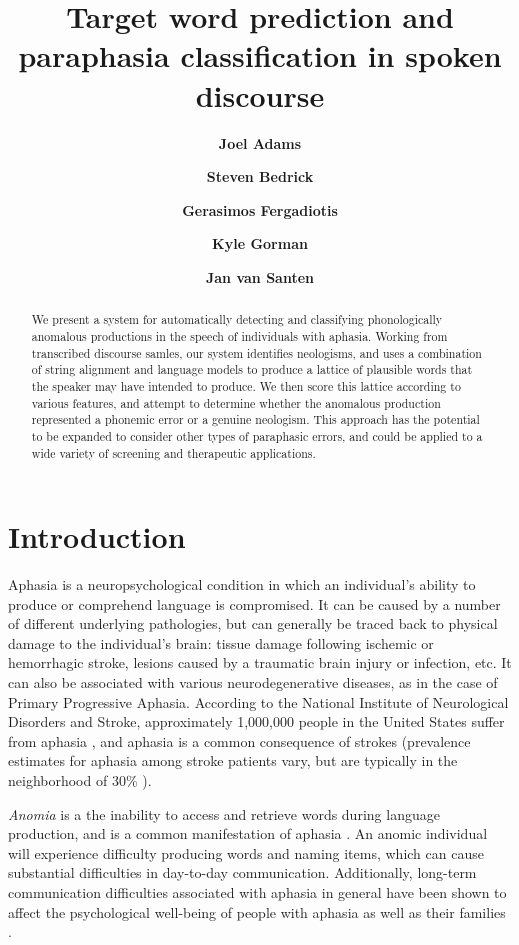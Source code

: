 \documentclass[11pt,letterpaper]{article}
\title{Target word prediction and paraphasia classification in spoken discourse}
\author[1]{\textbf{Joel Adams}}
\author[1]{\textbf{Steven Bedrick}}
\author[2]{\textbf{Gerasimos Fergadiotis}}
\author[3]{\textbf{Kyle Gorman}}
\author[1]{\textbf{Jan van Santen}}
\affil[1]{Center for Spoken Language Understanding, Oregon Health \& Science University, Portland, OR}
\affil[2]{Speech \& Hearing Sciences Department, Portland State University, Portland, OR}
\affil[3]{Google, Inc., New York, NY}
\date{}
\begin{document}
\maketitle

\begin{abstract}

We present a system for automatically detecting and classifying phonologically anomalous productions in the speech of individuals with aphasia.
Working from transcribed discourse samles, our system identifies neologisms, and uses a combination of string alignment and language models to produce a lattice of plausible words that the speaker may have intended to produce.
We then score this lattice according to various features, and attempt to determine whether the anomalous production represented a phonemic error or a genuine neologism.
This approach has the potential to be expanded to consider other types of paraphasic errors, and could be applied to a wide variety of screening and therapeutic applications.

\end{abstract}

\section{Introduction}

Aphasia is a neuropsychological condition in which an individual's ability to produce or comprehend language is compromised.
It can be caused by a number of different underlying pathologies, but can generally be traced back to physical damage to the individual's brain: tissue damage following ischemic or hemorrhagic stroke, lesions caused by a traumatic brain injury or infection, etc.
It can also be associated with various neurodegenerative diseases, as in the case of Primary Progressive Aphasia.
According to the National Institute of Neurological Disorders and Stroke, approximately 1,000,000 people in the United States suffer from aphasia \cite{National-Institute-of-Neurological-Disorders-and-Stroke:2014la}, and aphasia is a common consequence of strokes (prevalence estimates for aphasia among stroke patients vary, but are typically in the neighborhood of 30\% \cite{Engelter:2006da}).

\emph{Anomia} is a the inability to access and retrieve words during language production, and is a common manifestation of aphasia \cite{Goodglass:1997ys}.
An anomic individual will experience difficulty producing words and naming items, which can cause substantial difficulties in day-to-day communication.
Additionally, long-term communication difficulties associated with aphasia in general have been shown to affect the psychological well-being of people with aphasia as well as their families \cite{doi:10.1080/02687030244000707,Gaete:2008jr,vanDijk:2015gz}.
\end{document}
